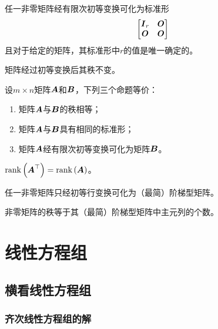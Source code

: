 \documentclass{ctexart}
\begin{document}
\begin{theorem}
    任一非零矩阵经有限次初等变换可化为标准形
    \begin{equation*}
        \begin{bmatrix}
            \boldsymbol{I}_r & \boldsymbol{O} \\\boldsymbol{O}&\boldsymbol{O}
        \end{bmatrix}
    \end{equation*}
    且对于给定的矩阵，其标准形中\(r\)的值是唯一确定的。
\end{theorem}

\begin{infer}
    矩阵经过初等变换后其秩不变。
\end{infer}

\begin{theorem}
    设\(m\times n\)矩阵\(\boldsymbol{A}\)和\(\boldsymbol{B}\)，下列三个命题等价：
    \begin{enumerate}
        \item 矩阵\(\boldsymbol{A}\)与\(\boldsymbol{B}\)的秩相等；
        \item 矩阵\(\boldsymbol{A}\)与\(\boldsymbol{B}\)具有相同的标准形；
        \item 矩阵\(\boldsymbol{A}\)经有限次初等变换可化为矩阵\(\boldsymbol{B}\)。
    \end{enumerate}
\end{theorem}

\begin{theorem}
    \(\mathrm{rank}\left( \boldsymbol{A}^\top \right)=\mathrm{rank}\left( \boldsymbol{A} \right)\)。
\end{theorem}

\begin{theorem}
    任一非零矩阵只经初等行变换可化为（最简）阶梯型矩阵。
\end{theorem}

\begin{infer}
    非零矩阵的秩等于其（最简）阶梯型矩阵中主元列的个数。
\end{infer}

\section{线性方程组}

\subsection{横看线性方程组}

\subsubsection*{齐次线性方程组的解}
\end{document}
